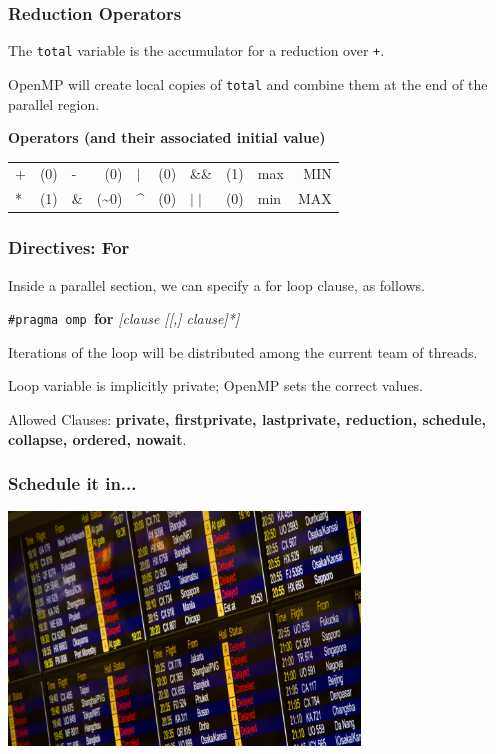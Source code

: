\begin{frame}
\frametitle{Reduction Operators}

The {\tt total} variable is the accumulator for a
reduction over {\tt +}. 

OpenMP will create local copies of {\tt total} and 
combine them at the end of the parallel region.

{\bf Operators (and their associated initial value)}
  \begin{center}
    \begin{tabular}{l r | l r | l r | l r | l r}
      + & (0) & -  &  (0) &    $\mid$ & (0) & \&\& & (1) & max & MIN\\
      * & (1) & \& & (\~{}0) & \^{} & (0) &   $\mid\mid$ & (0) & min & MAX\\ 
    \end{tabular}
  \end{center}
\end{frame}


\begin{frame}
\frametitle{Directives: For}

Inside a parallel section, we can
specify a for loop clause, as follows.

  \begin{center}
    {\tt \#pragma omp }{\bf for} {\it [clause [[,] clause]*]}
  \end{center}

    Iterations of the loop will be distributed among the
      current team of threads.
      
    Loop variable is implicitly private; OpenMP sets the
      correct values.

  Allowed Clauses: {\bf private, firstprivate, lastprivate, reduction, schedule,
    collapse, ordered, nowait}.

\end{frame}


\begin{frame}
\frametitle{Schedule it in...}

\begin{center}
	\includegraphics[width=0.7\textwidth]{images/schedule.jpeg}
\end{center}

\end{frame}




